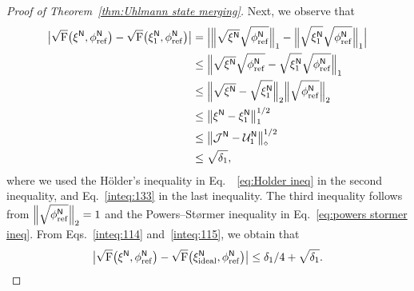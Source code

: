 \begin{proof}[Proof of Theorem~\ref{thm:Uhlmann state merging}]
Next, we observe that
\begin{align}
    \big|\sqrt{{\mathrm{F}}}\big(\xi^{\mathsf{N}}, \phi_{\rm ref}^{\mathsf{N}}\big) - \sqrt{{\mathrm{F}}}\big(\xi_1^{\mathsf{N}}, \phi_{\rm ref}^{\mathsf{N}}\big)\big|
    &= \Big| \Big\|\sqrt{\xi^{\mathsf{N}}}\sqrt{\phi_{\rm ref}^{\mathsf{N}}}\Big\|_1 -  \Big\|\sqrt{\xi_1^{\mathsf{N}}}\sqrt{\phi_{\rm ref}^{\mathsf{N}}}\Big\|_1\Big| \\
    &\leq \Big\| \sqrt{\xi^{\mathsf{N}}}\sqrt{\phi_{\rm ref}^{\mathsf{N}}} - \sqrt{\xi_1^{\mathsf{N}}}\sqrt{\phi_{\rm ref}^{\mathsf{N}}} \Big\|_1 \\
    &\leq \Big\|\sqrt{\xi^{\mathsf{N}}} - \sqrt{\xi_1^{\mathsf{N}}}\Big\|_2 \Big\|\sqrt{\phi_{\rm ref}^{\mathsf{N}}}\Big\|_2 \\
    &\leq \big\|\xi^{\mathsf{N}} - \xi_1^{\mathsf{N}}\big\|_1^{1/2} \\
    &\leq \big\|{\mathcal{J}}^{\mathsf{N}} - {\mathcal{U}}_1^{\mathsf{N}} \big\|_\diamond^{1/2} \\
    \label{inteq:115}
    &\leq \sqrt{\delta_1},
\end{align}
where we used the H\"{o}lder's inequality in Eq.~~\eqref{eq:Holder ineq} in the second inequality, and Eq.~\eqref{inteq:133} in the last inequality. The third inequality follows from $\Big\|\sqrt{\phi_{\rm ref}^{\mathsf{N}}}\Big\|_2 = 1$ and the Powers--St\o rmer inequality in Eq.~\eqref{eq:powers stormer ineq}.
From Eqs.~\eqref{inteq:114} and~\eqref{inteq:115}, we obtain that
\begin{align}
\label{inteq:116}
    \big|\sqrt{{\mathrm{F}}}\big(\xi^{\mathsf{N}}, \phi_{\rm ref}^{\mathsf{N}}\big) - \sqrt{{\mathrm{F}}}\big(\xi_{\rm ideal}^{\mathsf{N}}, \phi_{\rm ref}^{\mathsf{N}}\big)\big| \leq \delta_1/4 + \sqrt{\delta_1}.
\end{align}




\end{proof}
